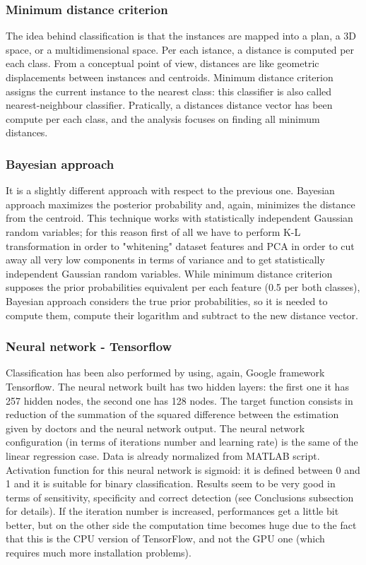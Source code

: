\documentclass{article}
\begin{document}
\subsubsection{Minimum distance criterion}
The idea behind classification is that the instances are mapped into a plan, a 3D space, or a multidimensional space. Per each istance, a distance is computed per each class. From a conceptual point of view, distances are like geometric displacements between instances and centroids. Minimum distance criterion assigns the current instance to the nearest class: this classifier is also called nearest-neighbour classifier. Pratically, a distances distance vector has been compute per each class, and the analysis focuses on finding all minimum distances.

\subsubsection{Bayesian approach}
It is a slightly different approach with respect to the previous one. Bayesian approach maximizes the posterior probability and, again, minimizes the distance from the centroid. This technique works with statistically independent Gaussian random variables; for this reason first of all we have to perform K-L transformation in order to "whitening" dataset features and PCA in order to cut away all very low components in terms of variance and to get statistically independent Gaussian random variables. While minimum distance criterion supposes the prior probabilities equivalent per each feature (0.5 per both classes), Bayesian approach considers the true prior probabilities, so it is needed to compute them, compute their logarithm and subtract to the new distance vector.\\

\subsubsection{Neural network - Tensorflow}
Classification has been also performed by using, again, Google framework Tensorflow. The neural network built has two hidden layers: the first one it has 257 hidden nodes, the second one has 128 nodes. The target function consists in reduction of the summation of the squared difference between the estimation given by doctors and the neural network output. The neural network configuration (in terms of iterations number and learning rate) is the same of the linear regression case. Data is already normalized from MATLAB script. Activation function for this neural network is sigmoid: it is defined between 0 and 1 and it is suitable for binary classification. Results seem to be very good in terms of sensitivity, specificity and correct detection (see Conclusions subsection for details). If the iteration number is increased, performances get a little bit better, but on the other side the computation time becomes huge due to the fact that this is the CPU version of TensorFlow, and not the GPU one (which requires much more installation problems).
\end{document}

